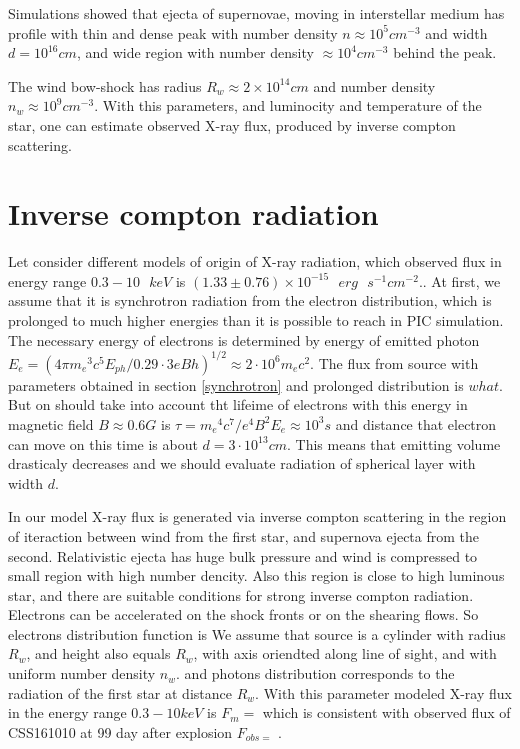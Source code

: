 \documentclass[a4paper,12pt]{extreport}
\begin{document}
Simulations showed that ejecta of supernovae, moving in interstellar medium has profile with thin and dense peak with number density $n \approx 10^5 cm^{-3}$ and width $d = 10^{16} cm$, and wide region with number density $\approx 10^4 cm^{-3}$ behind the peak.

The wind bow-shock has radius $R_w \approx 2\times10^{14} cm$ and number density $n_w \approx 10^9 cm^{-3}$. With this parameters, and luminocity and temperature of the star, one can estimate observed X-ray flux, produced by inverse compton scattering.
 
\section{Inverse compton radiation}\label{compton}

Let consider different models of origin of X-ray radiation, which observed flux in energy range $0.3 - 10\text{ }keV$ is $(1.33 \pm 0.76) \times 10^{-15}\text{ }erg\text{ }s^{-1} cm^{-2}$.. At first, we assume that it is synchrotron radiation from the electron distribution, which is prolonged to much higher energies than it is possible to reach in PIC simulation. The necessary energy of electrons is determined by energy of emitted photon $E_e = (4\pi{m_e}^3 c^5 E_{ph}/0.29\cdot3 e B h)^{1/2} \approx 2\cdot10^6 m_e c^2$. The flux from source with parameters obtained in section \ref{synchrotron} and prolonged distribution is $what$. But on should take into account tht lifeime of electrons with this energy in magnetic field $B \approx 0.6 G$ is $\tau = {m_e}^4 c^7 / e^4 B^2 E_e \approx 10^3 s$ and distance that electron can move on this time is about $d = 3\cdot10^13 cm$. This means that emitting volume drasticaly decreases and we should evaluate radiation of spherical layer with width $d$.

In our model X-ray flux is generated via inverse compton scattering in the region of iteraction between wind from the first star, and supernova ejecta from the second. Relativistic ejecta has huge bulk pressure and wind is compressed to small region with high number dencity. Also this region is close to high luminous star, and there are suitable conditions for strong inverse compton radiation. Electrons can be accelerated on the shock fronts or on the shearing flows. So electrons distribution function is 
We assume that source is a cylinder with radius $R_w$, and height also equals $R_w$, with axis oriendted along line of sight, and with uniform number density $n_w$. 
and photons distribution corresponds to the radiation of the first star at distance $R_w$. With this parameter modeled X-ray flux in the energy range $0.3-10 keV$ is $F_m = $ which is consistent with observed flux of CSS161010 at 99 day after explosion $F_{obs = }$ \cite{Coppejans2020}.



\end{document}
